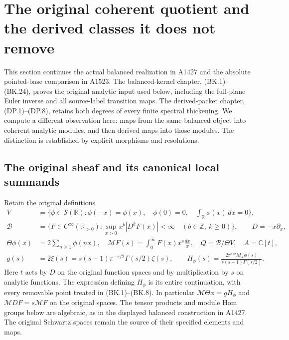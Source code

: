 \section{The original coherent quotient and the derived classes it does not remove}
\label{CFStage:sec:original-coherent-comparison}

This section continues the actual balanced realization in A1427 and the
absolute pointed-base comparison in A1523.  The balanced-kernel chapter,
(BK.1)--(BK.24), proves the original analytic input used below, including
the full-plane Euler inverse and all source-label transition maps.
The derived-packet chapter, (DP.1)--(DP.8), retains both degrees of every
finite spectral thickening.  We compute a different observation here:
maps from the same balanced object into coherent analytic modules, and
then derived maps into those modules.  The distinction is established by
explicit morphisms and resolutions.

\subsection{The original sheaf and its canonical local summands}

Retain the original definitions
\[
\begin{split}
 V&=\{\phi\in\mathcal S(\mathbb R):\phi(-x)=\phi(x),\quad
       \phi(0)=0,\quad\textstyle\int_{\mathbb R}\phi(x)\,dx=0\},\\
 \mathscr B&=\{F\in C^\infty(\mathbb R_{>0}):
   \sup_{x>0}x^b|D^kF(x)|<\infty\quad(b\in\mathbb Z,\ k\ge0)\},
       \qquad D=-x\partial_x,\\
 \Theta\phi(x)&=2\sum_{n\ge1}\phi(nx),\quad
 \mathcal MF(s)=\int_0^\infty F(x)x^s\frac{dx}{x},\quad
 Q=\mathscr B/\Theta V,\quad A=\mathbb C[t],\\
 g(s)&=2\xi(s)=s(s-1)\pi^{-s/2}\Gamma(s/2)\zeta(s),\qquad
 H_\phi(s)=\frac{2\pi^{s/2}M_+\phi(s)}{s(s-1)\Gamma(s/2)}.
\end{split}                                                     \tag{OCQ.1}
\]
Here $t$ acts by $D$ on the original function spaces and by multiplication
by $s$ on analytic functions.  The expression defining $H_\phi$ is its
entire continuation, with every removable point treated in (BK.1)--(BK.8).
In particular $\mathcal M\Theta\phi=gH_\phi$ and
$\mathcal M DF=s\mathcal MF$ on the original spaces.
The tensor products and module Hom groups below are algebraic, as in
the displayed balanced construction in A1427.  The original Schwartz
spaces remain the source of their specified elements and maps.

